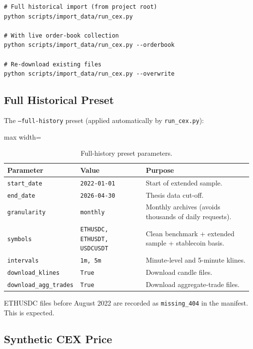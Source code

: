 \documentclass[11pt,a4paper]{article}
\begin{document}
\begin{lstlisting}
# Full historical import (from project root)
python scripts/import_data/run_cex.py

# With live order-book collection
python scripts/import_data/run_cex.py --orderbook

# Re-download existing files
python scripts/import_data/run_cex.py --overwrite
\end{lstlisting}

\subsection{Full Historical Preset}

The \texttt{--full-history} preset (applied automatically by \texttt{run\_cex.py}):

\begin{table}[H]
\centering
\small
\begin{adjustbox}{max width=\textwidth}
\begin{tabular}{lll}
\toprule
\textbf{Parameter} & \textbf{Value} & \textbf{Purpose} \\
\midrule
\texttt{start\_date} & \texttt{2022-01-01} & Start of extended sample. \\
\texttt{end\_date} & \texttt{2026-04-30} & Thesis data cut-off. \\
\texttt{granularity} & \texttt{monthly} & Monthly archives (avoids thousands of daily requests). \\
\texttt{symbols} & \texttt{ETHUSDC, ETHUSDT, USDCUSDT} & Clean benchmark + extended sample + stablecoin basis. \\
\texttt{intervals} & \texttt{1m, 5m} & Minute-level and 5-minute klines. \\
\texttt{download\_klines} & \texttt{True} & Download candle files. \\
\texttt{download\_agg\_trades} & \texttt{True} & Download aggregate-trade files. \\
\bottomrule
\end{tabular}
\end{adjustbox}
\caption{Full-history preset parameters.}
\end{table}

ETHUSDC files before August 2022 are recorded as \texttt{missing\_404} in the manifest. This is expected.

\subsection{Synthetic CEX Price}
\end{document}
